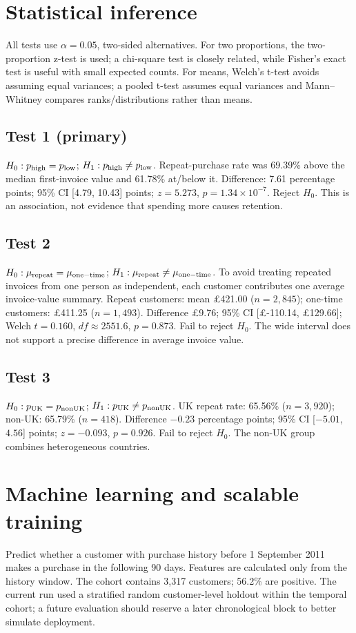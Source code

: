 \documentclass[10pt,a4paper,twocolumn]{article}
\begin{document}
\section{Statistical inference}
All tests use \(\alpha=0.05\), two-sided alternatives. For two proportions, the two-proportion z-test is used; a chi-square test is closely related, while Fisher's exact test is useful with small expected counts. For means, Welch's t-test avoids assuming equal variances; a pooled t-test assumes equal variances and Mann--Whitney compares ranks/distributions rather than means.

\subsection{Test 1 (primary)}
\(H_0:p_{\rm high}=p_{\rm low}\); \(H_1:p_{\rm high}\ne p_{\rm low}\). Repeat-purchase rate was 69.39\% above the median first-invoice value and 61.78\% at/below it. Difference: 7.61 percentage points; 95\% CI [4.79, 10.43] points; \(z=5.273\), \(p=1.34\times10^{-7}\). Reject \(H_0\). This is an association, not evidence that spending more causes retention.

\subsection{Test 2}
\(H_0:\mu_{\rm repeat}=\mu_{\rm one-time}\); \(H_1:\mu_{\rm repeat}\ne\mu_{\rm one-time}\). To avoid treating repeated invoices from one person as independent, each customer contributes one average invoice-value summary. Repeat customers: mean \pounds421.00 (\(n=2{,}845\)); one-time customers: \pounds411.25 (\(n=1{,}493\)). Difference \pounds9.76; 95\% CI [\pounds-110.14, \pounds129.66]; Welch \(t=0.160\), \(df\approx2551.6\), \(p=0.873\). Fail to reject \(H_0\). The wide interval does not support a precise difference in average invoice value.

\subsection{Test 3}
\(H_0:p_{\rm UK}=p_{\rm nonUK}\); \(H_1:p_{\rm UK}\ne p_{\rm nonUK}\). UK repeat rate: 65.56\% (\(n=3{,}920\)); non-UK: 65.79\% (\(n=418\)). Difference \(-0.23\) percentage points; 95\% CI [\(-5.01\), \(4.56\)] points; \(z=-0.093\), \(p=0.926\). Fail to reject \(H_0\). The non-UK group combines heterogeneous countries.

\section{Machine learning and scalable training}
Predict whether a customer with purchase history before 1 September 2011 makes a purchase in the following 90 days. Features are calculated only from the history window. The cohort contains 3,317 customers; 56.2\% are positive. The current run used a stratified random customer-level holdout within the temporal cohort; a future evaluation should reserve a later chronological block to better simulate deployment.
\end{document}
